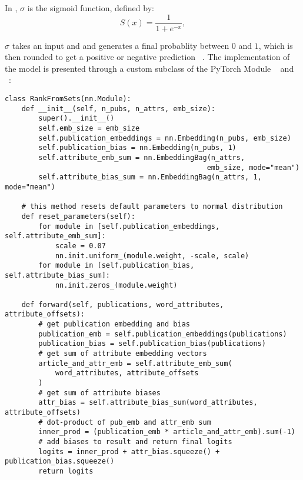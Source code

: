 In , $\sigma$ is the sigmoid function, defined by:
\begin{equation}
\label{eq:sigmoid}
S(x) = \frac{1}{1 + e^{-x}}, 
\end{equation}

$\sigma$ takes an input and and generates a final probablity between $0$ and $1$, which is then rounded to get a positive or negative prediction ~\parencite{svetoslav_2015}. The implementation of the model is presented through a custom subclass of the PyTorch Module ~\parencite{NEURIPS2019_9015} and ~\parencite{altosaar2020rankfromsets:}:

\begin{verbatim}
class RankFromSets(nn.Module):
    def __init__(self, n_pubs, n_attrs, emb_size):
        super().__init__()
        self.emb_size = emb_size
        self.publication_embeddings = nn.Embedding(n_pubs, emb_size)
        self.publication_bias = nn.Embedding(n_pubs, 1)
        self.attribute_emb_sum = nn.EmbeddingBag(n_attrs,
                                                emb_size, mode="mean")
        self.attribute_bias_sum = nn.EmbeddingBag(n_attrs, 1, mode="mean")

    # this method resets default parameters to normal distribution
    def reset_parameters(self):
        for module in [self.publication_embeddings, self.attribute_emb_sum]:
            scale = 0.07
            nn.init.uniform_(module.weight, -scale, scale)
        for module in [self.publication_bias, self.attribute_bias_sum]:
            nn.init.zeros_(module.weight)

    def forward(self, publications, word_attributes, attribute_offsets):
        # get publication embedding and bias
        publication_emb = self.publication_embeddings(publications)
        publication_bias = self.publication_bias(publications)
        # get sum of attribute embedding vectors
        article_and_attr_emb = self.attribute_emb_sum(
            word_attributes, attribute_offsets
        )
        # get sum of attribute biases
        attr_bias = self.attribute_bias_sum(word_attributes, attribute_offsets)
        # dot-product of pub_emb and attr_emb sum
        inner_prod = (publication_emb * article_and_attr_emb).sum(-1)
        # add biases to result and return final logits
        logits = inner_prod + attr_bias.squeeze() + publication_bias.squeeze()
        return logits
\end{verbatim}